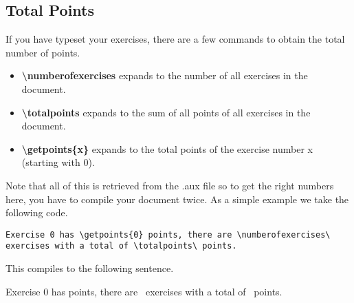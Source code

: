 \documentclass[
  twocolumn,%
  fontsize=9pt,%
  DIV=calc,%
  numbers=noendperiod%
]{scrartcl}
\begin{document}
\subsection{Total Points}
If you have typeset your exercises, there are a few commands to obtain the total number of points.

\begin{itemize}
  \item \textcolor{NavyBlue}{\ttfamily\bfseries\textbackslash numberofexercises} expands to the number of all exercises in the document.
  \item \textcolor{NavyBlue}{\ttfamily\bfseries\textbackslash totalpoints} expands to the sum of all points of all exercises in the document. 
  \item \textcolor{NavyBlue}{\ttfamily\bfseries\textbackslash getpoints\{x\}} expands to the total points of the exercise number x (starting with $0$). 
\end{itemize}
Note that all of this is retrieved from the .aux file so to get the right numbers here, you have to compile your document twice. As a simple example we take the following code.


\begin{lstlisting}[emph={numberofexercises,totalpoints,getpoints}]
  Exercise 0 has \getpoints{0} points, there are \numberofexercises\ exercises with a total of \totalpoints\ points.
\end{lstlisting}

\noindent This compiles to the following sentence.\smallskip

Exercise 0 has  points, there are \numberofexercises\ exercises with a total of \totalpoints\ points.
\end{document}
